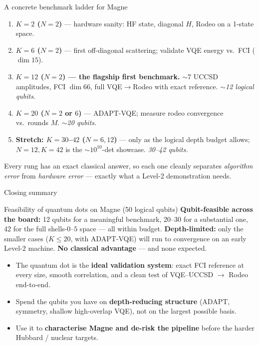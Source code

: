 \documentclass[aspectratio=169,11pt]{beamer}
\begin{document}
\begin{frame}{A concrete benchmark ladder for Magne}
\begin{enumerate}
  \item \textbf{$K=2$ ($N=2$)} --- hardware sanity: HF state, diagonal $H$, Rodeo on a 1-state space.
  \item \textbf{$K=6$ ($N=2$)} --- first off-diagonal scattering; validate VQE energy vs.\ FCI ($\dim 15$).
  \item \textbf{$K=12$ ($N=2$) --- the flagship first benchmark.} $\sim$7 UCCSD amplitudes,
        FCI $\dim 66$, full VQE$\to$Rodeo with exact reference. \emph{$\sim$12 logical qubits.}
  \item \textbf{$K=20$ ($N=2$ or $6$)} --- ADAPT-VQE; measure rodeo convergence vs.\ rounds $M$.
        \emph{$\sim$20 qubits.}
  \item \textbf{Stretch: $K=30$--$42$ ($N=6,12$)} --- only as the logical depth budget allows;
        $N{=}12,K{=}42$ is the $\sim\!10^{10}$-det showcase. \emph{30--42 qubits.}
\end{enumerate}
\vspace{2pt}
{\small\color{qngray} Every rung has an exact classical answer, so each one cleanly
separates \emph{algorithm error} from \emph{hardware error} --- exactly what a Level-2
demonstration needs.}
\end{frame}

\begin{frame}{Closing summary}
\begin{block}{Feasibility of quantum dots on Magne (50 logical qubits)}
\textbf{Qubit-feasible across the board:} 12 qubits for a meaningful benchmark,
20--30 for a substantial one, 42 for the full shells-$0$--$5$ space --- all within budget.
\textbf{Depth-limited:} only the smaller cases ($K\!\le\!20$, with ADAPT-VQE) will run to
convergence on an early Level-2 machine. \textbf{No classical advantage} --- and none expected.
\end{block}
\begin{itemize}
  \item The quantum dot is the \textbf{ideal validation system}: exact FCI reference at every size,
        smooth correlation, and a clean test of VQE--UCCSD $\to$ Rodeo end-to-end.
  \item Spend the qubits you have on \textbf{depth-reducing structure} (ADAPT, symmetry,
        shallow high-overlap VQE), not on the largest possible basis.
  \item Use it to \textbf{characterise Magne and de-risk the pipeline} before the
        harder Hubbard / nuclear targets.
\end{itemize}
\end{frame}
\end{document}
